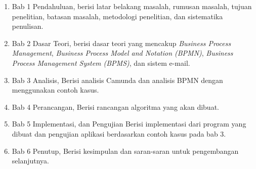 \begin{enumerate}
	\item Bab 1 Pendahuluan, berisi latar belakang masalah, rumusan masalah, tujuan penelitian, batasan masalah, metodologi penelitian, dan sistematika penulisan.
	\item Bab 2 Dasar Teori, berisi dasar teori yang mencakup \textit{Business Process Management}, \textit{Business Process Model and Notation (BPMN)}, \textit{Business Process Management System (BPMS)}, dan sistem e-mail.
	\item Bab 3 Analisis, Berisi analisis Camunda dan analisis BPMN dengan menggunakan contoh kasus.
	\item Bab 4 Perancangan, Berisi rancangan algoritma yang akan dibuat.
	\item Bab 5 Implementasi, dan Pengujian Berisi implementasi dari program yang dibuat dan pengujian aplikasi berdasarkan contoh kasus pada bab 3.
	\item Bab 6 Penutup, Berisi kesimpulan dan saran-saran untuk pengembangan selanjutnya.
\end{enumerate}


